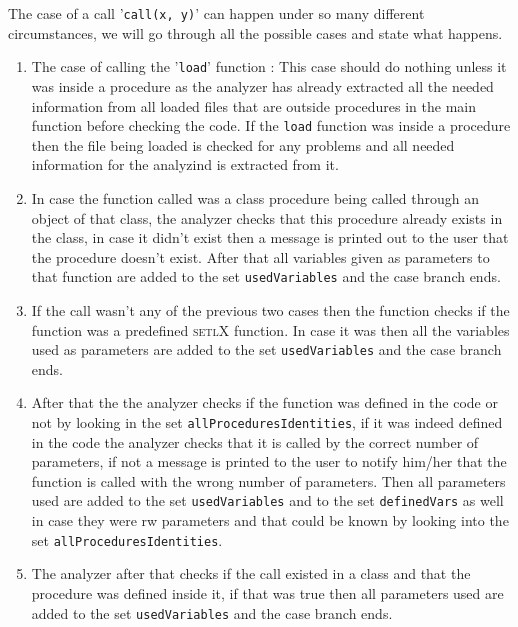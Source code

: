 \documentclass[11pt]{report}
\begin{document}
The case of a call '\texttt{call(x, y)}' can happen under so many different circumstances, we will go through all the possible cases and state what happens.

\begin{enumerate}

\item The case of calling the '\texttt{load}' function : This case should do nothing unless it was inside a procedure as the analyzer has already extracted all the needed information from all loaded files that are outside procedures in the main function before checking the code. If the \texttt{load} function was inside a procedure then the file being loaded is checked for any problems and all needed information for the analyzind is extracted from it.

\item In case the function called was a class procedure being called through an object of that class, the analyzer checks that this procedure already exists in the class, in case it didn't exist then a message is printed out to the user that the procedure doesn't exist. After that all variables given as parameters to that function are added to the set \texttt{usedVariables} and the case branch ends.

\item If the call wasn't any of the previous two cases then the function checks if the function was a predefined \textsc{setlX} function. In case it was then all the variables used as parameters are added to the set \texttt{usedVariables} and the case branch ends.

\item After that the the analyzer checks if the function was defined in the code or not by looking in the set \texttt{allProceduresIdentities}, if it was indeed defined in the code the analyzer checks that it is called by the correct number of parameters, if not a message is printed to the user to notify him/her that the function is called with the wrong number of parameters. Then all parameters used are added to the set \texttt{usedVariables} and to the set \texttt{definedVars} as well in case they were rw parameters and that could be known by looking into the set \texttt{allProceduresIdentities}.

\item The analyzer after that checks if the call existed in a class and that the procedure was defined inside it, if that was true then all parameters used are added to the set \texttt{usedVariables} and the case branch ends.


\end{enumerate}
\end{document}
